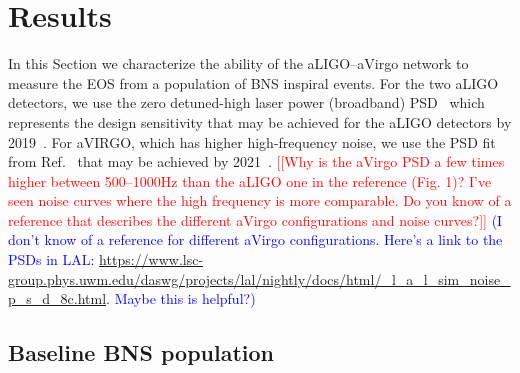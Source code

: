 \documentclass[twocolumn,prd,amssymb,aps,nofootinbib,showpacs,epsf]{revtex4}
\newcommand\ben[2]{\textcolor{red}{{#1}\sout{#2}}}
\newcommand\les[2]{\textcolor{blue}{{#1}\sout{#2}}}
\begin{document}
\section{Results}
\label{sec:results}

In this Section we characterize the ability of the aLIGO--aVirgo network to measure the EOS from a population of BNS inspiral events. For the two aLIGO detectors, we use the zero detuned-high laser power (broadband) PSD~\cite{LIGOnoise} which represents the design sensitivity that may be achieved for the aLIGO detectors by 2019~\cite{AasiAbadieAbbott2013}. For aVIRGO, which has higher high-frequency noise, we use the PSD fit from Ref.~\cite{ManzottiDietz2012} that may be achieved by 2021~\cite{AasiAbadieAbbott2013}. \ben{[[Why is the aVirgo PSD a few times higher between 500--1000Hz than the aLIGO one in the reference (Fig. 1)? I've seen noise curves where the high frequency is more comparable. Do you know of a reference that describes the different aVirgo configurations and noise curves?]]}{} \les{(I don't know of a reference for different aVirgo configurations. Here's a link to the PSDs in LAL: \url{https://www.lsc-group.phys.uwm.edu/daswg/projects/lal/nightly/docs/html/_l_a_l_sim_noise_p_s_d_8c.html}. Maybe this is helpful?)}{}


\subsection{Baseline BNS population}
\label{sec:baseline}
\end{document}
